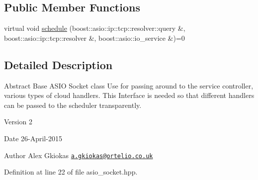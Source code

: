 \subsection*{Public Member Functions}
\begin{DoxyCompactItemize}
\item 
virtual void \hyperlink{classrapp_1_1cloud_1_1asio__socket_a3782c40466dc0ce70d645d65bcae6c01}{schedule} (boost\-::asio\-::ip\-::tcp\-::resolver\-::query \&, boost\-::asio\-::ip\-::tcp\-::resolver \&, boost\-::asio\-::io\-\_\-service \&)=0
\end{DoxyCompactItemize}


\subsection{Detailed Description}
Abstract Base A\-S\-I\-O Socket class Use for passing around to the service controller, various types of cloud handlers. This Interface is needed so that different handlers can be passed to the scheduler transparently. 

\begin{DoxyVersion}{Version}
2 
\end{DoxyVersion}
\begin{DoxyDate}{Date}
26-\/\-April-\/2015 
\end{DoxyDate}
\begin{DoxyAuthor}{Author}
Alex Gkiokas \href{mailto:a.gkiokas@ortelio.co.uk}{\tt a.\-gkiokas@ortelio.\-co.\-uk} 
\end{DoxyAuthor}


Definition at line 22 of file asio\-\_\-socket.\-hpp.




